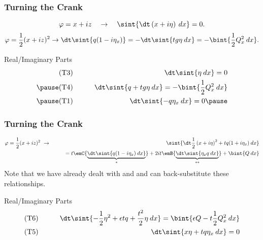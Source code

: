 \begin{frame}[t]\frametitle{Turning the Crank}
    \begin{displaymath}
        \varphi = x + iz \quad \rightarrow\quad \sint{\dt\left(x + i\eta\right)\:dx} = 0.
    \end{displaymath}
    \pause
    $$\varphi = \frac{1}{2}(x+iz)^2 \rightarrow \dt\sint{q(1-i\eta_x)} = -\dt\sint{ tg\eta\:dx} = -\bint{\frac{1}{2}Q_x^2\:dx}.$$  \pause
    \begin{block}{Real/Imaginary Parts}
        \vspace*{-.2in}
        \begin{eqnarray*}
            \text{(T3)}\qquad &&\dt\sint{\eta\:dx} = 0\\ \pause
            \text{(T4)}\qquad &&\dt\sint{q+ tg\eta\:dx} = -\bint{\frac{1}{2}Q_x^2\:dx}\\ \pause 
            \text{(T1)}\qquad &&\dt\sint{-q \eta_x\:dx} = 0 \pause
        \end{eqnarray*}
    \end{block}
\end{frame}


\begin{frame}[t]\frametitle{Turning the Crank}
    \begin{eqnarray*}
        \varphi = \frac{1}{2}(x + iz)^2 ~ &\rightarrow&~ \sint{\dt\frac{1}{2}\left(x + i\eta\right)^2 + t q (1 + i\eta_x)\:dx} \\ 
        &&\qquad =t\emC{\underbrace{\dt\sint{ q(1-i\eta_x)\:dx}}_{*}}+2it\emB{\underbrace{\dt\sint{\eta_x q\:dx}}_{**}} + \bint{ Q\:dx}
    \end{eqnarray*}
    \pause
    Note that we have already dealt with \emC{$(*)$} and \emB{$(**)$} and can back-substitute these relationships.%
    \begin{block}{Real/Imaginary Parts}
        \vspace*{-.2in}
        \begin{eqnarray*}
            \text{(T6)}\qquad &&\dt\sint{-\frac{1}{2}\eta^2 + \epsilon t q + \frac{ t^2}{2}\eta\:dx} = \bint{\epsilon Q - t\frac{1}{2}Q_x^2\:dx}\\
            \text{(T5)}\qquad &&\dt\sint{ x\eta + t  q \eta_x\:dx} = 0
        \end{eqnarray*}
    \end{block}
\end{frame}

